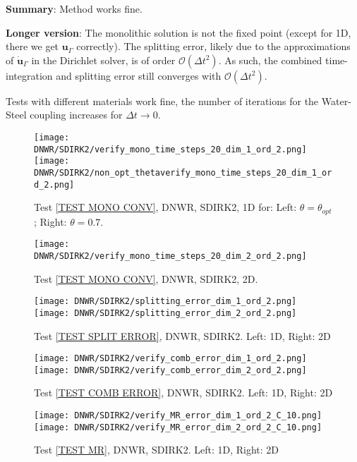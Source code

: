 \documentclass[a4paper,10pt]{article}
\begin{document}
\textbf{Summary}: Method works fine.

\textbf{Longer version}: The monolithic solution is not the fixed point (except for 1D, there we get $\bm{u}_\Gamma$ correctly). The splitting error, likely due to the approximations of $\dot{\bm{u}}_\Gamma$ in the Dirichlet solver, is of order $\mathcal{O}(\Delta t^2)$. As such, the combined time-integration and splitting error still converges with $\mathcal{O}(\Delta t^2)$.

Tests with different materials work fine, the number of iterations for the Water-Steel coupling increases for $\Delta t \rightarrow 0$.

\begin{figure}[!ht]
\texttt{[image: DNWR/SDIRK2/verify\_mono\_time\_steps\_20\_dim\_1\_ord\_2.png]}
\texttt{[image: DNWR/SDIRK2/non\_opt\_thetaverify\_mono\_time\_steps\_20\_dim\_1\_ord\_2.png]}
\caption{Test \ref{TEST MONO CONV}, DNWR, SDIRK2, 1D for: Left: $\theta = \theta_{opt}$; Right: $\theta = 0.7$.}
\label{FIG DNWR SDIRK2 1D MONO CONV}
\end{figure}

\begin{figure}[!ht]
\texttt{[image: DNWR/SDIRK2/verify\_mono\_time\_steps\_20\_dim\_2\_ord\_2.png]}
\caption{Test \ref{TEST MONO CONV}, DNWR, SDIRK2, 2D.}
\label{FIG DNWR SDIRK2 2D MONO CONV}
\end{figure}

\begin{figure}[!ht]
\texttt{[image: DNWR/SDIRK2/splitting\_error\_dim\_1\_ord\_2.png]}
\texttt{[image: DNWR/SDIRK2/splitting\_error\_dim\_2\_ord\_2.png]}
\caption{Test \ref{TEST SPLIT ERROR}, DNWR, SDIRK2. Left: 1D, Right: 2D}
\label{FIG DNWR SDIRK2 SPLIT ERROR}
\end{figure}

\begin{figure}[!ht]
\texttt{[image: DNWR/SDIRK2/verify\_comb\_error\_dim\_1\_ord\_2.png]}
\texttt{[image: DNWR/SDIRK2/verify\_comb\_error\_dim\_2\_ord\_2.png]}
\caption{Test \ref{TEST COMB ERROR}, DNWR, SDIRK2. Left: 1D, Right: 2D}
\label{FIG DNWR SDIRK2 COMB ERROR}
\end{figure}

\begin{figure}[!ht]
\texttt{[image: DNWR/SDIRK2/verify\_MR\_error\_dim\_1\_ord\_2\_C\_10.png]}
\texttt{[image: DNWR/SDIRK2/verify\_MR\_error\_dim\_2\_ord\_2\_C\_10.png]}
\caption{Test \ref{TEST MR}, DNWR, SDIRK2. Left: 1D, Right: 2D}
\label{FIG DNWR SDIRK2 MR ERROR}
\end{figure}
\end{document}
